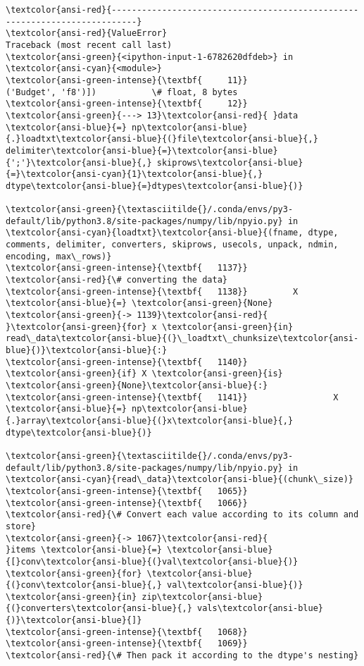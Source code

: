 \documentclass[10pt]{scrartcl}
\begin{document}
    \begin{Verbatim}[commandchars=\\\{\}, frame=single, framerule=2mm, rulecolor=\color{outerrorbackground}]
\textcolor{ansi-red}{---------------------------------------------------------------------------}
\textcolor{ansi-red}{ValueError}                                Traceback (most recent call last)
\textcolor{ansi-green}{<ipython-input-1-6782620dfdeb>} in \textcolor{ansi-cyan}{<module>}
\textcolor{ansi-green-intense}{\textbf{     11}}                    ('Budget', 'f8')])           \# float, 8 bytes
\textcolor{ansi-green-intense}{\textbf{     12}} 
\textcolor{ansi-green}{---> 13}\textcolor{ansi-red}{ }data \textcolor{ansi-blue}{=} np\textcolor{ansi-blue}{.}loadtxt\textcolor{ansi-blue}{(}file\textcolor{ansi-blue}{,} delimiter\textcolor{ansi-blue}{=}\textcolor{ansi-blue}{';'}\textcolor{ansi-blue}{,} skiprows\textcolor{ansi-blue}{=}\textcolor{ansi-cyan}{1}\textcolor{ansi-blue}{,} dtype\textcolor{ansi-blue}{=}dtypes\textcolor{ansi-blue}{)}

\textcolor{ansi-green}{\textasciitilde{}/.conda/envs/py3-default/lib/python3.8/site-packages/numpy/lib/npyio.py} in \textcolor{ansi-cyan}{loadtxt}\textcolor{ansi-blue}{(fname, dtype, comments, delimiter, converters, skiprows, usecols, unpack, ndmin, encoding, max\_rows)}
\textcolor{ansi-green-intense}{\textbf{   1137}}         \textcolor{ansi-red}{\# converting the data}
\textcolor{ansi-green-intense}{\textbf{   1138}}         X \textcolor{ansi-blue}{=} \textcolor{ansi-green}{None}
\textcolor{ansi-green}{-> 1139}\textcolor{ansi-red}{         }\textcolor{ansi-green}{for} x \textcolor{ansi-green}{in} read\_data\textcolor{ansi-blue}{(}\_loadtxt\_chunksize\textcolor{ansi-blue}{)}\textcolor{ansi-blue}{:}
\textcolor{ansi-green-intense}{\textbf{   1140}}             \textcolor{ansi-green}{if} X \textcolor{ansi-green}{is} \textcolor{ansi-green}{None}\textcolor{ansi-blue}{:}
\textcolor{ansi-green-intense}{\textbf{   1141}}                 X \textcolor{ansi-blue}{=} np\textcolor{ansi-blue}{.}array\textcolor{ansi-blue}{(}x\textcolor{ansi-blue}{,} dtype\textcolor{ansi-blue}{)}

\textcolor{ansi-green}{\textasciitilde{}/.conda/envs/py3-default/lib/python3.8/site-packages/numpy/lib/npyio.py} in \textcolor{ansi-cyan}{read\_data}\textcolor{ansi-blue}{(chunk\_size)}
\textcolor{ansi-green-intense}{\textbf{   1065}} 
\textcolor{ansi-green-intense}{\textbf{   1066}}             \textcolor{ansi-red}{\# Convert each value according to its column and store}
\textcolor{ansi-green}{-> 1067}\textcolor{ansi-red}{             }items \textcolor{ansi-blue}{=} \textcolor{ansi-blue}{[}conv\textcolor{ansi-blue}{(}val\textcolor{ansi-blue}{)} \textcolor{ansi-green}{for} \textcolor{ansi-blue}{(}conv\textcolor{ansi-blue}{,} val\textcolor{ansi-blue}{)} \textcolor{ansi-green}{in} zip\textcolor{ansi-blue}{(}converters\textcolor{ansi-blue}{,} vals\textcolor{ansi-blue}{)}\textcolor{ansi-blue}{]}
\textcolor{ansi-green-intense}{\textbf{   1068}} 
\textcolor{ansi-green-intense}{\textbf{   1069}}             \textcolor{ansi-red}{\# Then pack it according to the dtype's nesting}


\end{Verbatim}
\end{document}
